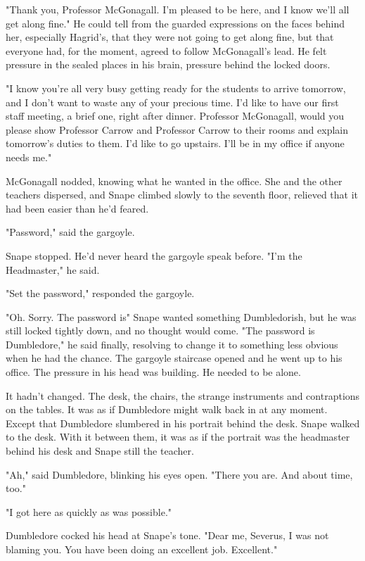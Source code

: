 "Thank you, Professor McGonagall. I'm pleased to be here, and I know we'll all get along fine." He could tell from the guarded expressions on the faces behind her, especially Hagrid's, that they were not going to get along fine, but that everyone had, for the moment, agreed to follow McGonagall's lead. He felt pressure in the sealed places in his brain, pressure behind the locked doors.

"I know you're all very busy getting ready for the students to arrive tomorrow, and I don't want to waste any of your precious time. I'd like to have our first staff meeting, a brief one, right after dinner. Professor McGonagall, would you please show Professor Carrow and Professor Carrow to their rooms and explain tomorrow's duties to them. I'd like to go upstairs. I'll be in my office if anyone needs me."

McGonagall nodded, knowing what he wanted in the office. She and the other teachers dispersed, and Snape climbed slowly to the seventh floor, relieved that it had been easier than he'd feared.

"Password," said the gargoyle.

Snape stopped. He'd never heard the gargoyle speak before. "I'm the Headmaster," he said.

"Set the password," responded the gargoyle.

"Oh. Sorry. The password is{\el}" Snape wanted something Dumbledorish, but he was still locked tightly down, and no thought would come. "The password is Dumbledore," he said finally, resolving to change it to something less obvious when he had the chance. The gargoyle staircase opened and he went up to his office. The pressure in his head was building. He needed to be alone.

It hadn't changed. The desk, the chairs, the strange instruments and contraptions on the tables. It was as if Dumbledore might walk back in at any moment. Except that Dumbledore slumbered in his portrait behind the desk. Snape walked to the desk. With it between them, it was as if the portrait was the headmaster behind his desk and Snape still the teacher.

"Ah," said Dumbledore, blinking his eyes open. "There you are. And about time, too."

"I got here as quickly as was possible."

Dumbledore cocked his head at Snape's tone. "Dear me, Severus, I was not blaming you. You have been doing an excellent job. Excellent."

